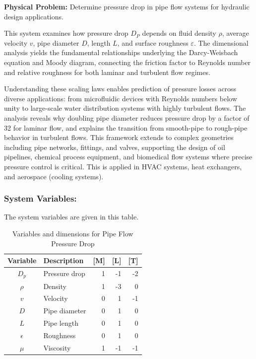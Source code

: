 \begin{problembox}
\textbf{Physical Problem:} Determine pressure drop in pipe flow systems for hydraulic design applications.
\end{problembox}
\begin{codebox}
This system examines how pressure drop $D_P$ depends on fluid density $\rho$, average velocity $v$, pipe diameter $D$, length $L$, and surface roughness $\varepsilon$. The dimensional analysis yields the fundamental relationships underlying the Darcy-Weisbach equation and Moody diagram, connecting the friction factor to Reynolds number and relative roughness for both laminar and turbulent flow regimes.

Understanding these scaling laws enables prediction of pressure losses across diverse applications: from microfluidic devices with Reynolds numbers below unity to large-scale water distribution systems with highly turbulent flows. The analysis reveals why doubling pipe diameter reduces pressure drop by a factor of 32 for laminar flow, and explains the transition from smooth-pipe to rough-pipe behavior in turbulent flows. This framework extends to complex geometries including pipe networks, fittings, and valves, supporting the design of oil pipelines, chemical process equipment, and biomedical flow systems where precise pressure control is critical. This is applied in HVAC systems, heat exchangers, and aerospace (cooling systems).
\end{codebox}
\subsubsection*{System Variables: } The system variables are given in this table.

\begin{table}[htpb]
\centering
\begin{tabular}{|c|l|r|r|r|}
\hline
\textbf{Variable} & \textbf{Description} & \textbf{[M]} & \textbf{[L]} & \textbf{[T]} \\
\hline
$D_p$ & Pressure drop & 1 & -1 & -2 \\
$\rho$ & Density & 1 & -3 & 0 \\
$v$ & Velocity & 0 & 1 & -1 \\
$D$ & Pipe diameter & 0 & 1 & 0 \\
$L$ & Pipe length & 0 & 1 & 0 \\
$\epsilon$ & Roughness & 0 & 1 & 0 \\
$\mu$ & Viscosity & 1 & -1 & -1 \\
\hline
\end{tabular}
\caption{Variables and dimensions for Pipe Flow Pressure Drop}
\end{table}

